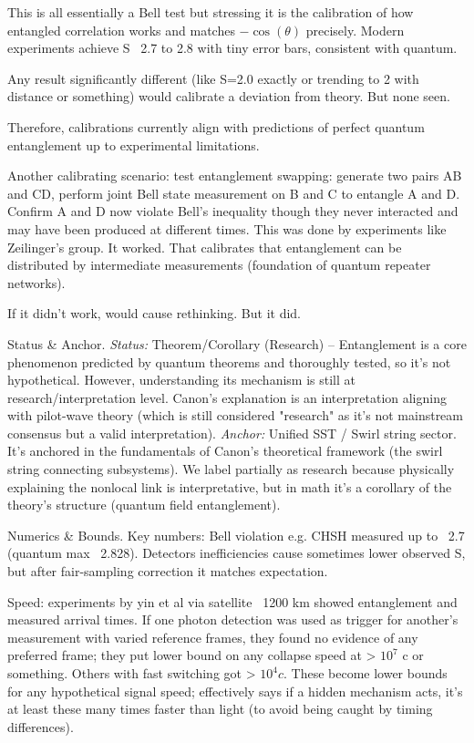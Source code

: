\documentclass[11pt]{article}
\begin{document}
This is all essentially a Bell test but stressing it is the calibration of how entangled correlation works and matches $-\cos(\theta)$ precisely. Modern experiments achieve S ~2.7 to 2.8 with tiny error bars, consistent with quantum.

Any result significantly different (like S=2.0 exactly or trending to 2 with distance or something) would calibrate a deviation from theory. But none seen.

Therefore, calibrations currently align with predictions of perfect quantum entanglement up to experimental limitations.

Another calibrating scenario: test entanglement swapping: generate two pairs AB and CD, perform joint Bell state measurement on B and C to entangle A and D. Confirm A and D now violate Bell's inequality though they never interacted and may have been produced at different times. This was done by experiments like Zeilinger's group. It worked. That calibrates that entanglement can be distributed by intermediate measurements (foundation of quantum repeater networks).

If it didn't work, would cause rethinking. But it did.


Status & Anchor. \textit{Status:} Theorem/Corollary (Research) – Entanglement is a core phenomenon predicted by quantum theorems and thoroughly tested, so it's not hypothetical. However, understanding its mechanism is still at research/interpretation level. Canon’s explanation is an interpretation aligning with pilot-wave theory (which is still considered "research" as it's not mainstream consensus but a valid interpretation). \textit{Anchor:} Unified SST / Swirl string sector. It's anchored in the fundamentals of Canon’s theoretical framework (the swirl string connecting subsystems). We label partially as research because physically explaining the nonlocal link is interpretative, but in math it’s a corollary of the theory’s structure (quantum field entanglement).


Numerics & Bounds. Key numbers: Bell violation e.g. CHSH measured up to ~2.7 (quantum max ~2.828). Detectors inefficiencies cause sometimes lower observed S, but after fair-sampling correction it matches expectation.

Speed: experiments by yin et al via satellite ~1200 km showed entanglement and measured arrival times. If one photon detection was used as trigger for another's measurement with varied reference frames, they found no evidence of any preferred frame; they put lower bound on any collapse speed at > $10^7$ c or something. Others with fast switching got > $10^4 c$. These become lower bounds for any hypothetical signal speed; effectively says if a hidden mechanism acts, it's at least these many times faster than light (to avoid being caught by timing differences).
\end{document}
